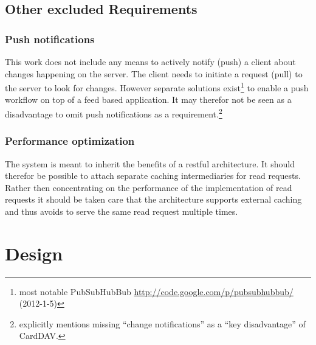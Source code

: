 \documentclass[12pt,a4paper,twoside]{scrartcl}		%
\newcommand{\citeurl}[2]{\url{#1} (#2)}
\begin{document}
\subsection{Other excluded Requirements}
\label{sec:other-excl-requ}

\subsubsection{Push notifications} %
This work does not include any means to actively notify (push) a client about
changes happening on the server. The client needs to initiate a request (pull)
to the server to look for changes. However separate solutions
exist\footnote{most notable PubSubHubBub
  \citeurl{http://code.google.com/p/pubsubhubbub/}{2012-1-5}} to enable a push
workflow on top of a feed based
application\cite{Wilde:2009:FQP:1693155.1693220}. It may therefor not be seen as
a disadvantage to omit push notifications as a
requirement.\footnote{\cite[sec. 1]{RFC6352} explicitly mentions missing
  ``change notifications'' as a ``key disadvantage'' of CardDAV.}

\subsubsection{Performance optimization}
The system is meant to inherit the benefits of a restful architecture. It should
therefor be possible to attach separate caching intermediaries for read
requests. Rather then concentrating on the performance of the implementation of
read requests it should be taken care that the architecture supports external
caching and thus avoids to serve the same read request multiple times.

\section{Design}
\label{sec:design}



\end{document}
